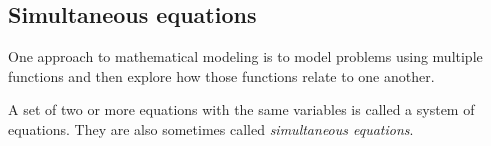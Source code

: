 

\subsection{Simultaneous equations}

One approach to mathematical modeling is to model problems using multiple functions and then explore how those functions relate to one another. 

\begin{boxdef}
A set of two or more equations with the same variables is called a \gls{system of equations}. They are also sometimes called \textit{simultaneous equations}.
\end{boxdef}



